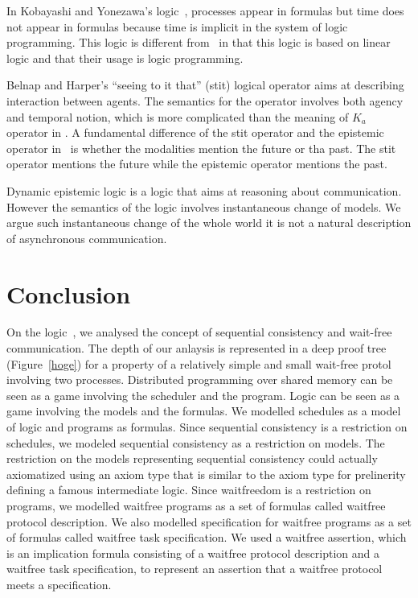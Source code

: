 In Kobayashi and Yonezawa's logic~\cite{kobayashi1995asynchronous}, processes
appear in formulas but time does not appear in formulas
because time is implicit in the system of logic programming.
This logic is different from \iec\, in that this logic is based on linear logic and that their
usage is logic programming.

Belnap and Harper's ``seeing to it that'' (stit) logical operator
aims at describing interaction between agents.
The semantics for the operator involves both agency and temporal notion, which is more
complicated than the meaning of $K_a$ operator in \iec.
A fundamental difference of the stit operator and the epistemic operator in \iec\,
is whether the modalities mention the future or tha past.
The stit operator mentions the future while the epistemic operator mentions the past.

Dynamic epistemic logic is a logic that aims at reasoning about communication.
However the semantics of the logic involves
instantaneous change of models.
We argue such instantaneous change of the whole world it is
not a natural description of asynchronous communication.


\section{Conclusion}
\label{conclusion}


On the logic~\iec, we analysed the concept of sequential consistency and wait-free
communication.
The depth of our anlaysis is represented in a deep proof tree (Figure~\ref{hoge}) for a
property of a relatively simple and small wait-free protol involving two processes.
Distributed programming over shared memory can be seen as a game involving the scheduler
and the program.
Logic can be seen as a game involving the models and the formulas.
We modelled schedules as a model of logic and programs as formulas.
Since sequential consistency is a restriction on schedules,
we modeled sequential consistency as a restriction on models.
The restriction on the models representing sequential consistency could actually
axiomatized using an axiom type that is similar to the axiom type for prelinerity defining
a famous intermediate logic.
Since waitfreedom is a restriction on programs,
we modelled waitfree programs as a set of formulas called waitfree protocol description.
We also modelled specification for waitfree programs as a set of formulas called waitfree
task specification.
We used a waitfree assertion, which is
an implication formula consisting of a waitfree protocol description and a
waitfree task specification,
 to represent
an assertion that a waitfree protocol meets a specification.




